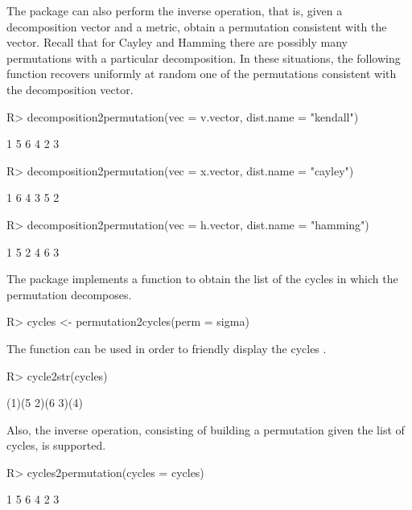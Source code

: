 \documentclass[article,nojss]{jss}
\begin{document}
The  package can also perform the inverse operation, that is, given a decomposition vector and a metric, obtain a permutation consistent with the vector. Recall that for Cayley and Hamming there are possibly many permutations with a particular decomposition. In these situations, the following function recovers uniformly at random one of the permutations consistent with the decomposition vector.
\begin{Schunk}
\begin{Sinput}
R> decomposition2permutation(vec = v.vector, dist.name = "kendall")
\end{Sinput}
\begin{Soutput}
[1] 1 5 6 4 2 3
\end{Soutput}
\begin{Sinput}
R> decomposition2permutation(vec = x.vector, dist.name = "cayley")
\end{Sinput}
\begin{Soutput}
[1] 1 6 4 3 5 2
\end{Soutput}
\begin{Sinput}
R> decomposition2permutation(vec = h.vector, dist.name = "hamming")
\end{Sinput}
\begin{Soutput}
[1] 1 5 2 4 6 3
\end{Soutput}
\end{Schunk}

The  package implements a function to obtain the list of the cycles in which the permutation decomposes. 
\begin{Schunk}
\begin{Sinput}
R> cycles <- permutation2cycles(perm = sigma)
\end{Sinput}
\end{Schunk}

The  function can be used in order to friendly display the cycles .
\begin{Schunk}
\begin{Sinput}
R> cycle2str(cycles)
\end{Sinput}
\begin{Soutput}
(1)(5 2)(6 3)(4)
\end{Soutput}
\end{Schunk}

Also, the inverse operation, consisting of building a permutation given the list of cycles, is supported. 
\begin{Schunk}
\begin{Sinput}
R> cycles2permutation(cycles = cycles)
\end{Sinput}
\begin{Soutput}
[1] 1 5 6 4 2 3
\end{Soutput}
\end{Schunk}
\end{document}
